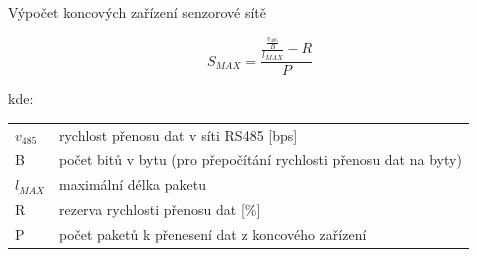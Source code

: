 \documentclass{beamer}
\begin{document}
\begin{frame}{Výpočet koncových zařízení senzorové sítě}


	\begin{equation}
		S_{MAX} = \frac{\frac{\frac{v_{485}}{B}}{l_{MAX}} - R}{P}
		\end{equation}
		
	\fontsize{10}{12}\selectfont 

		kde:
		
		\begin{tabular}{l @{  } l}
		$v_{485}$ & rychlost přenosu dat v síti RS485 [bps]\\
		B        & počet bitů v bytu (pro přepočítání rychlosti přenosu dat na byty) \\
		$l_{MAX}$ & maximální délka paketu \\
		R        & rezerva rychlosti přenosu dat [\%]\\
		P        & počet paketů k přenesení dat z koncového zařízení \\
	\end{tabular}

\end{frame}




\end{document}
